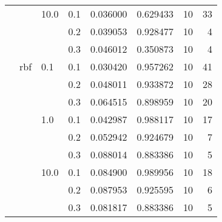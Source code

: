 \begin{table}[H]
\begin{tabular}{llllrrrr}
       &     & 10.0 & 0.1 &    0.036000 &  0.629433 &      10 &    33 \\
       &     &      & 0.2 &    0.039053 &  0.928477 &      10 &     4 \\
       &     &      & 0.3 &    0.046012 &  0.350873 &      10 &     4 \\
       & rbf & 0.1  & 0.1 &    0.030420 &  0.957262 &      10 &    41 \\
       &     &      & 0.2 &    0.048011 &  0.933872 &      10 &    28 \\
       &     &      & 0.3 &    0.064515 &  0.898959 &      10 &    20 \\
       &     & 1.0  & 0.1 &    0.042987 &  0.988117 &      10 &    17 \\
       &     &      & 0.2 &    0.052942 &  0.924679 &      10 &     7 \\
       &     &      & 0.3 &    0.088014 &  0.883386 &      10 &     5 \\
       &     & 10.0 & 0.1 &    0.084900 &  0.989956 &      10 &    18 \\
       &     &      & 0.2 &    0.087953 &  0.925595 &      10 &     6 \\
       &     &      & 0.3 &    0.081817 &  0.883386 &      10 &     5 \\
\bottomrule
\end{tabular}
\end{table}
